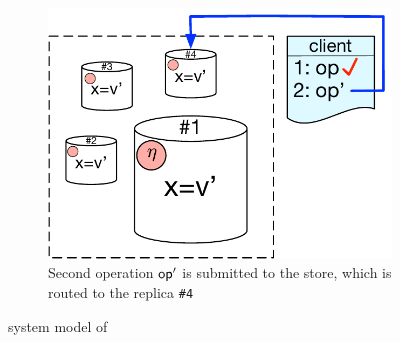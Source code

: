 \begin{figure}[t]
\begin{subfigure}[t]{0.3\textwidth}
        \centering
	\includegraphics[scale=0.32]{Figures/system_model3.pdf}
        \caption{\scriptsize Second operation ${\normalfont \textsf{op}}'$ is submitted to the store, which
	is routed to the replica \texttt{\#4}}
        \label{fig:sys_model3}
    \end{subfigure}
    \caption{system model of \tool}\label{fig:system_model}
\end{figure}
